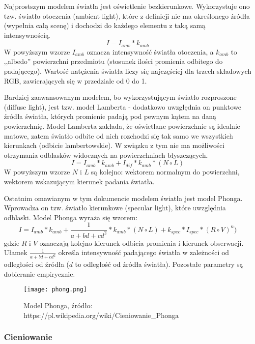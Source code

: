Najprostszym modelem światła jest oświetlenie bezkierunkowe. Wykorzystuje ono tzw. światło otoczenia (ambient light), które z definicji nie ma określonego źródła (wypełnia całą scenę) i dochodzi do każdego elementu z taką samą intensywnością.
$$I = I_{amb} * k_{amb}$$
W powyższym wzorze $I_{amb}$ oznacza intensywność światła otoczenia, a $k_{amb}$ to ,,albedo'' powierzchni przedmiotu (stosunek ilości promienia odbitego do padającego). Wartość natężenia światła liczy się najczęściej dla trzech składowych RGB, zawierających się w przedziale od 0 do 1.


Bardziej zaawansowanym modelem, bo wykorzystującym światło rozproszone (diffuse light), jest tzw. model Lamberta - dodatkowo uwzględnia on punktowe źródła światła, których promienie padają pod pewnym kątem na daną powierzchnię. Model Lamberta zakłada, że oświetlane powierzchnie są idealnie matowe, zatem światło odbite od nich rozchodzi się tak samo we wszystkich kierunkach (odbicie lambertowskie). W związku z tym nie ma możliwości otrzymania odblasków widocznych na powierzchniach błyszczących.
$$I = I_{amb} * k_{amb} + I_{dif} * k_{amb} * (N \circ L)$$
W powyższym wzorze $N$ i $L$ są kolejno: wektorem normalnym do powierzchni, wektorem wskazującym kierunek padania światła.


Ostatnim omawianym w tym dokumencie modelem światła jest model Phonga. Wprowadza on tzw. światło kierunkowe (specular light), które uwzględnia odblaski. Model Phonga wyraża się wzorem:
$$I = I_{amb} * k_{amb} + \frac{1}{a + bd + cd^2} * k_{amb} * (N \circ L) + k_{spec} * I_{spec} * (R \circ V)^n)$$
gdzie $R$ i $V$ oznaczają kolejno kierunek odbicia promienia i kierunek obserwacji. Ułamek $\frac{1}{a + bd + cd^2}$ określa intensywność padającego światła w zależności od odległości od źródła ($d$ to odległość od źródła światła). Pozostałe parametry są dobieranie empirycznie.

\begin{figure}[h!]
\centering
  \texttt{[image: phong.png]}
  \caption{Model Phonga, źródło: https://pl.wikipedia.org/wiki/Cieniowanie\_Phonga}
\end{figure}

\subsubsection{Cieniowanie}

